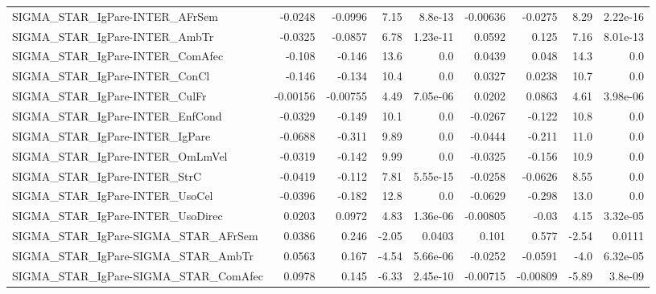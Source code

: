 \begin{tabular}{lrrrrrrrr}
SIGMA\_STAR\_IgPare-INTER\_AFrSem         &     -0.0248 &      -0.0996 &    7.15 &  8.8e-13 &   -0.00636 &     -0.0275 &         8.29 &      2.22e-16 \\
SIGMA\_STAR\_IgPare-INTER\_AmbTr          &     -0.0325 &      -0.0857 &    6.78 & 1.23e-11 &     0.0592 &       0.125 &         7.16 &      8.01e-13 \\
SIGMA\_STAR\_IgPare-INTER\_ComAfec        &      -0.108 &       -0.146 &    13.6 &      0.0 &     0.0439 &       0.048 &         14.3 &           0.0 \\
SIGMA\_STAR\_IgPare-INTER\_ConCl          &      -0.146 &       -0.134 &    10.4 &      0.0 &     0.0327 &      0.0238 &         10.7 &           0.0 \\
SIGMA\_STAR\_IgPare-INTER\_CulFr          &    -0.00156 &     -0.00755 &    4.49 & 7.05e-06 &     0.0202 &      0.0863 &         4.61 &      3.98e-06 \\
SIGMA\_STAR\_IgPare-INTER\_EnfCond        &     -0.0329 &       -0.149 &    10.1 &      0.0 &    -0.0267 &      -0.122 &         10.8 &           0.0 \\
SIGMA\_STAR\_IgPare-INTER\_IgPare         &     -0.0688 &       -0.311 &    9.89 &      0.0 &    -0.0444 &      -0.211 &         11.0 &           0.0 \\
SIGMA\_STAR\_IgPare-INTER\_OmLmVel        &     -0.0319 &       -0.142 &    9.99 &      0.0 &    -0.0325 &      -0.156 &         10.9 &           0.0 \\
SIGMA\_STAR\_IgPare-INTER\_StrC           &     -0.0419 &       -0.112 &    7.81 & 5.55e-15 &    -0.0258 &     -0.0626 &         8.55 &           0.0 \\
SIGMA\_STAR\_IgPare-INTER\_UsoCel         &     -0.0396 &       -0.182 &    12.8 &      0.0 &    -0.0629 &      -0.298 &         13.0 &           0.0 \\
SIGMA\_STAR\_IgPare-INTER\_UsoDirec       &      0.0203 &       0.0972 &    4.83 & 1.36e-06 &   -0.00805 &       -0.03 &         4.15 &      3.32e-05 \\
SIGMA\_STAR\_IgPare-SIGMA\_STAR\_AFrSem    &      0.0386 &        0.246 &   -2.05 &   0.0403 &      0.101 &       0.577 &        -2.54 &        0.0111 \\
SIGMA\_STAR\_IgPare-SIGMA\_STAR\_AmbTr     &      0.0563 &        0.167 &   -4.54 & 5.66e-06 &    -0.0252 &     -0.0591 &         -4.0 &      6.32e-05 \\
SIGMA\_STAR\_IgPare-SIGMA\_STAR\_ComAfec   &      0.0978 &        0.145 &   -6.33 & 2.45e-10 &   -0.00715 &    -0.00809 &        -5.89 &       3.8e-09 \\

\end{tabular}
